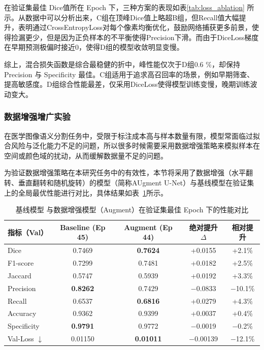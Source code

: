 在验证集最佳 Dice值所在 Epoch 下，三种方案的表现如表\~\ref{tab:loss_ablation} 所示。从数据中可以分析出来，C组在顶峰Dice值上略超B组，但Recall值大幅提升，表明通过CrossEntropyLoss对每个像素均衡优化，鼓励网络捕获更多前景，使得捡漏更少，但是因为正负样本的不平衡使得Precision下滑。而由于DiceLoss梯度在早期预测极偏时接近0，使得D组的模型收敛明显变慢。

综上，混合损失函数是综合最稳健的折中，峰性能仅次于D组0.6 \%，却保持 Precision 与 Specificity 最佳。C组适用于追求高召回率的场景，例如早期筛查、提高敏感度。D组综合性能最差，仅采用DiceLoss使得模型训练变慢，晚期训练波动变大。

\subsubsection{数据增强增广实验}

在医学图像语义分割任务中，受限于标注成本高与样本数量有限，模型常面临过拟合风险与泛化能力不足的问题，所以很多时候需要采用数据增强策略来模拟样本在空间或颜色域的扰动，从而缓解数据量不足的问题。

为验证数据增强策略在本研究任务中的有效性，本节将采用了数据增强（水平翻转、垂直翻转和随机旋转）的模型（简称AUgment U-Net）与基线模型在验证集上的全局最优性能进行对比，具体结果如表~\ref{tab:augment_best}所示。

\begin{table}[htbp]
    \centering
    \caption{基线模型 与数据增强模型（Augment）在验证集最佳 Epoch 下的性能对比}
    \label{tab:augment_best}
    \begin{tabular}{lcccc}
        \toprule
        指标（Val） & Baseline (Ep 45) & Augment (Ep 44) & 绝对提升 $\Delta$ & 相对提升 \\
        \midrule
        Dice        & 0.7469 & \textbf{0.7624} & +0.0155 & +2.1\% \\
        F1-score    & 0.7299 & 0.7481 & +0.0182 & +2.5\% \\
        Jaccard     & 0.5747 & 0.5939 & +0.0192 & +3.3\% \\
        Precision   & \textbf{0.8262} & 0.7429 & $-$0.0833 & $-$10.1\% \\
        Recall      & 0.6537 & \textbf{0.6816} & +0.0279 & +4.3\% \\
        Accuracy    & 0.9362 & 0.9399 & +0.0037 & +0.4\% \\
        Specificity & \textbf{0.9791} & 0.9772 & $-$0.0019 & $-$0.2\% \\
        Val-Loss $\downarrow$ & 0.01150 & \textbf{0.01011} & $-$0.00139 & $-$12.1\% \\
        \bottomrule
    \end{tabular}
\end{table}

